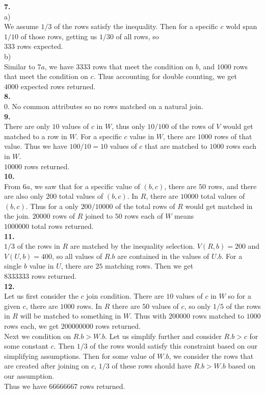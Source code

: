 \documentclass[12pt, letterpaper, fleqn]{article}
\begin{document}
  \textbf{7.} \\
  a) \\
  We assume $1/3$ of the rows satisfy the inequality. Then for a
  specific $c$ wold span $1/10$ of those rows, getting us $1/30$ of all rows, so
  \\
  $333$ rows expected.\\

  b) \\
  Similar to $7a$, we have $3333$ rows that meet the condition on $b$, and
  $1000$ rows that meet the condition on $c$. Thus accounting for double
  counting, we get \\
  $4000$ expected rows returned.\\

  \textbf{8.} \\
  $0$. No common attributes so no rows matched on a natural join.\\

  \textbf{9.} \\
  There are only $10$ values of $c$ in $W$, thus only $10/100$ of the rows of
  $V$ would get matched to a row in $W$. For a specific $c$ value in $W$, there
  are $1000$ rows of that value. Thus we have $100/10 = 10$ values of $c$ that
  are matched to $1000$ rows each in $W$. \\
  $10000$ rows returned. \\
  
  \textbf{10.} \\ 
  From $6a$, we saw that for a specific value of $(b,c)$, there are $50$ rows,
  and there are also only $200$ total values of $(b,c)$. In $R$, there are
  $10000$ total values of $(b,c)$. Thus for a only $200/10000$ of the total rows
  of $R$ would get matched in the join. $20000$ rows of $R$ joined to $50$ rows
  each of $W$ means \\
  $1000000$ total rows returned.\\

  \textbf{11.} \\
  $1/3$ of the rows in $R$ are matched by the inequality selection. $V(R,b) =
  200$ and $V(U,b) = 400$, so all values of $R.b$ are contained in the values of
  $U.b$.  For a single $b$ value in $U$, there are $25$ matching rows. Then
  we get \\
  $8333333$ rows returned.\\

  \textbf{12.} \\
  Let us first consider the $c$ join condition. There are $10$ values of $c$ in
  $W$ so for a given $c$, there are $1000$ rows. In $R$ there are $50$ values of
  $c$, so only $1/5$ of the rows in $R$ will be matched to something in $W$.
  Thus with $200000$ rows matched to $1000$ rows each, we get $200000000$ rows
  returned.\\
  Next we condition on $R.b > W.b$. Let us simplify further and consider $R.b >
  c$ for some constant $c$. Then $1/3$ of the rows would satisfy this constraint
  based on our simplifying assumptions. Then for some value of $W.b$, we
  consider the rows that are created after joining on $c$, $1/3$ of these rows
  should have $R.b > W.b$ based on our assumption.\\
  Thus we have $66666667$ rows returned.
\end{document}
